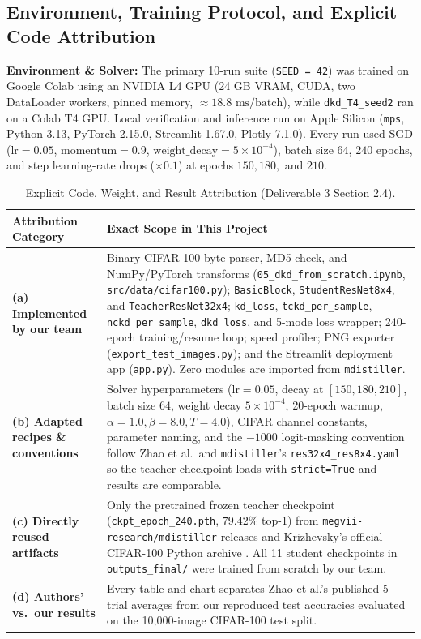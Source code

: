 \documentclass[11pt]{article}
\begin{document}
\subsection{Environment, Training Protocol, and Explicit Code Attribution}

\textbf{Environment \& Solver:} The primary 10-run suite (\texttt{SEED = 42}) was trained on Google Colab using an NVIDIA L4 GPU (24 GB VRAM, CUDA, two DataLoader workers, pinned memory, \(\approx 18.8\text{ ms/batch}\)), while \texttt{dkd\_T4\_seed2} ran on a Colab T4 GPU. Local verification and inference run on Apple Silicon (\texttt{mps}, Python 3.13, PyTorch 2.15.0, Streamlit 1.67.0, Plotly 7.1.0). Every run used SGD (\(\text{lr}=0.05\), \(\text{momentum}=0.9\), \(\text{weight\_decay}=5 \times 10^{-4}\)), batch size \(64\), \(240\) epochs, and step learning-rate drops (\(\times 0.1\)) at epochs \(150, 180,\) and \(210\).

\begin{table}[H]
\centering
\small
\caption{Explicit Code, Weight, and Result Attribution (Deliverable 3 Section 2.4).}
\label{tab:attribution}
\begin{tabular}{@{}p{3.8cm}p{11.3cm}@{}}
\toprule
\textbf{Attribution Category} & \textbf{Exact Scope in This Project} \\
\midrule
\textbf{(a) Implemented by our team} & Binary CIFAR-100 byte parser, MD5 check, and NumPy/PyTorch transforms (\texttt{05\_dkd\_from\_scratch.ipynb}, \texttt{src/data/cifar100.py}); \texttt{BasicBlock}, \texttt{StudentResNet8x4}, and \texttt{TeacherResNet32x4}; \texttt{kd\_loss}, \texttt{tckd\_per\_sample}, \texttt{nckd\_per\_sample}, \texttt{dkd\_loss}, and 5-mode loss wrapper; 240-epoch training/resume loop; speed profiler; PNG exporter (\texttt{export\_test\_images.py}); and the Streamlit deployment app (\texttt{app.py}). Zero modules are imported from \texttt{mdistiller}. \\
\addlinespace[0.3em]
\textbf{(b) Adapted recipes \& conventions} & Solver hyperparameters (\(\text{lr}=0.05\), decay at \([150, 180, 210]\), batch size \(64\), weight decay \(5\times 10^{-4}\), 20-epoch warmup, \(\alpha=1.0, \beta=8.0, T=4.0\)), CIFAR channel constants, parameter naming, and the \(-1000\) logit-masking convention follow Zhao et al.\ and \texttt{mdistiller}'s \texttt{res32x4\_res8x4.yaml} so the teacher checkpoint loads with \texttt{strict=True} and results are comparable. \\
\addlinespace[0.3em]
\textbf{(c) Directly reused artifacts} & Only the pretrained frozen teacher checkpoint (\texttt{ckpt\_epoch\_240.pth}, \(79.42\%\) top-1) from \texttt{megvii-research/mdistiller} releases and Krizhevsky's official CIFAR-100 Python archive \cite{krizhevsky2009}. All 11 student checkpoints in \texttt{outputs\_final/} were trained from scratch by our team. \\
\addlinespace[0.3em]
\textbf{(d) Authors' vs.\ our results} & Every table and chart separates Zhao et al.'s published 5-trial averages \cite{zhao2022} from our reproduced test accuracies evaluated on the 10,000-image CIFAR-100 test split. \\
\bottomrule
\end{tabular}
\end{table}
\end{document}
